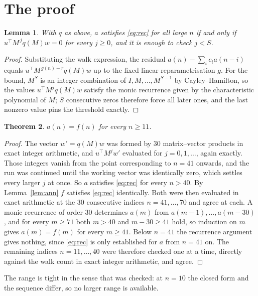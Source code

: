 \documentclass[11pt,a4paper]{article}
\theoremstyle{plain}
\newtheorem{theorem}{Theorem}
\newtheorem{lemma}[theorem]{Lemma}
\theoremstyle{definition}
\begin{document}
\section{The proof}

\begin{lemma}\label{lem:crit}
With $q$ as above, $a$ satisfies \eqref{eq:rec} for all large $n$ if and only if
$u^{\!\top}M^{\,j}q(M)w=0$ for every $j\ge0$, and it is enough to check $j<S$.
\end{lemma}

\begin{proof}
Substituting the walk expression, the residual $a(n)-\sum_ic_ia(n-i)$ equals
$u^{\!\top}M^{\,g(n)-r}q(M)w$ up to the fixed linear reparametrisation $g$. For the bound,
$M^{S}$ is an integer combination of $I,M,\dots,M^{S-1}$ by Cayley--Hamilton, so the values
$u^{\!\top}M^{j}q(M)w$ satisfy the monic recurrence given by the characteristic polynomial of
$M$; $S$ consecutive zeros therefore force all later ones, and the last nonzero value pins the
threshold exactly.
\end{proof}

\begin{theorem}
$a(n)=f(n)$ for every $n\ge11$.
\end{theorem}

\begin{proof}
The vector $w'=q(M)w$ was formed by $30$ matrix--vector products in exact integer
arithmetic, and $u^{\!\top}M^{j}w'$ evaluated for $j=0,1,\dots$, again exactly. Those integers
vanish from the point corresponding to $n=41$ onwards, and the run was continued until the
working vector was identically zero, which settles every larger $j$ at once. So $a$ satisfies
\eqref{eq:rec} for every $n>40$. By Lemma~\ref{lem:ann} $f$ satisfies \eqref{eq:rec}
identically. Both were then evaluated in exact arithmetic at the $30$ consecutive indices
$n=41,\dots,70$ and agree at each. A monic recurrence of order $30$
determines $a(m)$ from $a(m-1),\dots,a(m-30)$, and for every $m\ge71$ both
$m>40$ and $m-30\ge41$ hold, so induction on $m$ gives $a(m)=f(m)$ for every
$m\ge41$.
Below $n=41$ the recurrence argument gives nothing, since \eqref{eq:rec} is only
established for $a$ from $n=41$ on. The remaining indices $n=11,\dots,40$ were
therefore checked one at a time, directly against the walk count in exact integer arithmetic,
and agree.
\end{proof}

The range is tight in the sense that was checked: at $n=10$ the closed form and the sequence differ, so no larger range is available.
\end{document}
